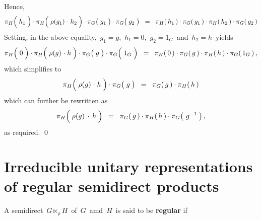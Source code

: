 \begin{enumerate}
	Hence,
	\begin{equation*}
		\pi_{H}\!\left(\;\overset{{\color{white}.}}{h_{1}}\;\right)
		\cdot
		\pi_{H}\!\left(\;\rho(g_{1}) \overset{{\color{white}1}}{\cdot} h_{2}\;\right)
		\cdot
		\pi_{G}\!\left(\;\overset{{\color{white}.}}{g_{1}}\;\right)
		\cdot
		\pi_{G}\!\left(\;\overset{{\color{white}.}}{g_{2}}\;\right)
	\;\; = \;\;
		\pi_{H}(\,h_{1}\,) \cdot \pi_{G}(\,g_{1}\,)
		\cdot
		\pi_{H}(\,h_{2}\,) \cdot \pi_{G}(\,g_{2}\,)
	\end{equation*}
	Setting, in the above equality,
	\,$g_{1} = g$,\,  $h_{1} = 0$,\, $g_{2} = 1_{G}$\, and \,$h_{2} = h$\,
	yields
	\begin{equation*}
		\pi_{H}\!\left(\;\overset{{\color{white}.}}{0}\;\right)
		\cdot
		\pi_{H}\!\left(\;\rho(g) \overset{{\color{white}1}}{\cdot} h\;\right)
		\cdot
		\pi_{G}\!\left(\;\overset{{\color{white}.}}{g}\;\right)
		\cdot
		\pi_{G}\!\left(\;\overset{{\color{white}.}}{1_{G}}\;\right)
	\;\; = \;\;
		\pi_{H}(\,0\,) \cdot \pi_{G}(\,g\,)
		\cdot
		\pi_{H}(\,h\,) \cdot \pi_{G}(\,1_{G}\,)\,,
	\end{equation*}
	which simplifies to
	\begin{equation*}
		\pi_{H}\!\left(\;\rho(g) \overset{{\color{white}1}}{\cdot} h\;\right)
		\cdot
		\pi_{G}\!\left(\;\overset{{\color{white}.}}{g}\;\right)
	\;\; = \;\;
		\pi_{G}(\,g\,)
		\cdot
		\pi_{H}(\,h\,)
	\end{equation*}
	which can further be rewritten as
	\begin{equation*}
		\pi_{H}\!\left(\;\rho(g) \overset{{\color{white}-}}{\cdot} h\;\right)
	\;\; = \;\;
		\pi_{G}(\,g\,)
		\cdot
		\pi_{H}(\,h\,)
		\cdot
		\pi_{G}\!\left(\,\overset{{\color{white}.}}{{\color{white}g}}\!\!g^{-1}\;\right),
	\end{equation*}
	as required. \qed
\end{enumerate}


\vskip 0.5cm
\section{Irreducible unitary representations of regular semidirect products}

\vskip 0.5cm
\begin{definition}
\mbox{}
\vskip 0.1cm
\noindent
A semidirect
\,$G \ltimes_{\rho}\! H$\, of \,$G$\, amd \,$H$\,
is said to be \textbf{regular} if

\end{definition}

